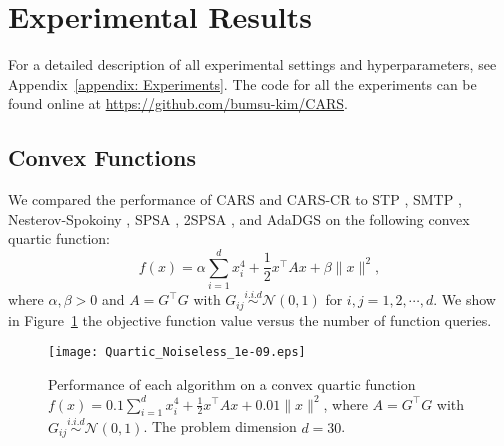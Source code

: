 \section{Experimental Results}
\label{sec:ExperimentalResults}
For a detailed description of all experimental settings and hyperparameters, see Appendix~\ref{appendix: Experiments}. The code for all the experiments can be found online at \url{https://github.com/bumsu-kim/CARS}.

 
\subsection{Convex Functions}
We compared the performance of CARS and CARS-CR to STP \cite{bergou2020stochastic}, SMTP \cite{gorbunov2019stochastic}, Nesterov-Spokoiny \cite{nesterov2017random}, SPSA \cite{spall1992multivariate}, 2SPSA \cite{spall2000adaptive}, and AdaDGS \cite{tran2020adadgs}
on the following convex quartic function:
\begin{equation*}
    f(x) = \alpha\sum_{i=1}^{d} x_i^4 + \frac{1}{2}x^{\top}Ax + \beta\|x\|^2,
\end{equation*}
where $\alpha, \beta>0$ and $A = G^{\top}G$ with $G_{ij} \stackrel{i.i.d}{\sim} \mathcal{N}(0, 1)$ for $i, j = 1,2,\cdots,d$. We show in Figure~\ref{fig:Convex Quartic} the objective function value versus the number of function queries.

\begin{figure}
    \centering
    \texttt{[image: Quartic\_Noiseless\_1e-09.eps]}
    \caption{Performance of each algorithm on a convex quartic function $f(x) = 0.1\sum_{i=1}^{d} x_i^4 + \frac{1}{2}x^{\top}Ax + 0.01\|x\|^2$, where $A = G^{\top}G$ with $G_{ij} \stackrel{i.i.d}{\sim} \mathcal{N}(0, 1)$. The problem dimension $d = 30$.}
    \label{fig:Convex Quartic}
\end{figure}

